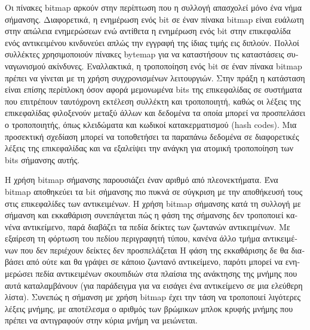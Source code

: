\begin{greek}
Οι πίνακες bitmap αρκούν στην περίπτωση που η συλλογή απασχολεί
μόνο ένα νήμα σήμανσης. Διαφορετικά, η ενημέρωση ενός bit σε
έναν πίνακα bitmap είναι ευάλωτη στην απώλεια ενημερώσεων ενώ
αντίθετα η ενημέρωση ενός bit στην επικεφαλίδα ενός αντικειμένου
κινδυνεύει απλώς την εγγραφή της ίδιας τιμής εις διπλούν. Πολλοί
συλλέκτες χρησιμοποιούν πίνακες bytemap για να καταστήσουν τις
καταστάσεις συναγωνισμού ακίνδυνες. Εναλλακτικά, η τροποποίηση
ενός bit σε έναν πίνακα bitmap πρέπει να γίνεται με τη χρήση
συγχρονισμένων λειτουργιών. Στην πράξη η κατάσταση είναι επίσης
περίπλοκη όσον αφορά μεμονωμένα bits της επικεφαλίδας σε συστήματα
που επιτρέπουν ταυτόχρονη εκτέλεση συλλέκτη και τροποποιητή, καθώς
οι λέξεις της επικεφαλίδας φιλοξενούν μεταξύ άλλων και δεδομένα
τα οποία μπορεί να προσπελάσει ο τροποποιητής, όπως κλειδώματα
και κωδικοί κατακερματισμού (hash codes). Μια προσεκτική σχεδίαση
μπορεί να τοποθετήσει τα παραπάνω δεδομένα σε διαφορετικές
λέξεις της επικεφαλίδας και να εξαλείψει την ανάγκη για ατομική
τροποποίηση των bits σήμανσης αυτής.

Η χρήση bitmap σήμανσης παρουσιάζει έναν αριθμό από πλεονεκτήματα.
Ένα bitmap αποθηκεύει τα bit σήμανσης πιο πυκνά σε σύγκριση με
την αποθήκευσή τους στις επικεφαλίδες των αντικειμένων. Η χρήση
bitmap σήμανσης κατά τη συλλογή με σήμανση και εκκαθάριση συνεπάγεται
πώς η φάση της σήμανσης δεν τροποποιεί κανένα αντικείμενο, παρά
διαβάζει τα πεδία δείκτες των ζωντανών αντικειμένων. Με εξαίρεση
τη φόρτωση του πεδίου περιγραφητή τύπου, κανένα άλλο τμήμα αντικειμένων
που δεν περιέχουν δείκτες δεν προσπελάζεται Η φάση της εκκαθάρισης
δε θα διαβάσει από ούτε και θα γράψει σε κάποιο ζωντανό αντικείμενο,
παρότι μπορεί να ενημερώσει πεδία αντικειμένων σκουπιδιών στα 
πλαίσια της ανάκτησης της μνήμης που αυτά καταλαμβάνουν (για παράδειγμα
για να εισάγει ένα αντικείμενο σε μια ελεύθερη λίστα). Συνεπώς 
η σήμανση με χρήση bitmap έχει την τάση να τροποποιεί λιγότερες 
λέξεις μνήμης, με αποτέλεσμα ο αριθμός των βρώμικων μπλοκ κρυφής
μνήμης που πρέπει να αντιγραφούν στην κύρια μνήμη να μειώνεται.


\end{greek}
